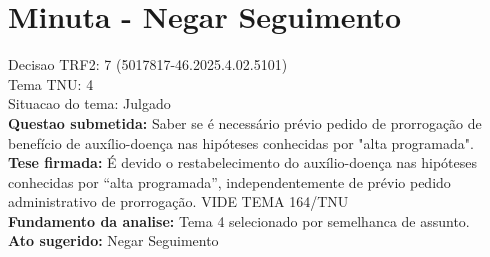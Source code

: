 \documentclass{article}
\begin{document}
\section*{Minuta - Negar Seguimento}
Decisao TRF2: 7 (5017817-46.2025.4.02.5101)\\
Tema TNU: 4\\
Situacao do tema: Julgado\\
\textbf{Questao submetida:} Saber se é necessário prévio pedido de prorrogação de benefício de auxílio-doença nas hipóteses conhecidas por "alta programada".\\
\textbf{Tese firmada:} É devido o restabelecimento do auxílio-doença nas hipóteses conhecidas por “alta programada”, independentemente de prévio pedido administrativo de prorrogação. VIDE TEMA 164/TNU\\
\textbf{Fundamento da analise:} Tema 4 selecionado por semelhanca de assunto.\\
\textbf{Ato sugerido:} Negar Seguimento
\end{document}
